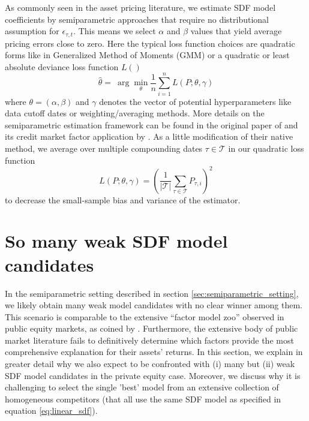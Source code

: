 \documentclass[12pt]{article}
\begin{document}
As commonly seen in the asset pricing literature, we estimate SDF model coefficients by semiparametric approaches that require no distributional assumption for $\epsilon_{\tau,t}$.
This means we select $\alpha$ and $\beta$ values that yield average pricing errors close to zero. 
Here the typical loss function choices are quadratic forms like in Generalized Method of Moments (GMM) or a quadratic or least absolute deviance loss function $L()$
\begin{equation}
\label{eq:minimization_estimation}
\hat{\theta } = \
\arg \min_{\theta} \frac{1}{n} \sum_{i=1}^n L \left( P ; \theta, \gamma \right)
\end{equation}
where $\theta=(\alpha,\beta)$ and $\gamma$ denotes the vector of potential hyperparameters like data cutoff dates or weighting/averaging methods.
More details on the semiparametric estimation framework can be found in the original paper of \cite{DLP12} and its credit market factor application by \cite{HSS23}.
As a little modification of their native method, we average over multiple compounding dates $\tau \in \mathcal{T}$ in our quadratic loss function
\begin{equation}
	\label{eq:quadratic_loss}
	L \left( P ; \theta, \gamma \right) = \left( \frac{1}{|\mathcal{T}|} \sum_{\tau \in \mathcal{T}} P_{\tau,i}  \right)^2
\end{equation}
to decrease the small-sample bias and variance of the estimator.


\section{So many weak SDF model candidates}
\label{sec:model_selection}

In the semiparametric setting described in section \ref{sec:semiparametric_setting}, we likely obtain many weak model candidates with no clear winner among them.
This scenario is comparable to the extensive ``factor model zoo'' observed in public equity markets, as coined by \cite{C11,FGX20}. Furthermore, the extensive body of public market literature fails to definitively determine which factors provide the most comprehensive explanation for their assets' returns.
In this section, we explain in greater detail why we also expect to be confronted with (i) many but (ii) weak SDF model candidates in the private equity case.
Moreover, we discuss why it is challenging to select the single 'best' model from an extensive collection of homogeneous competitors (that all use the same SDF model as specified in equation \ref{eq:linear_sdf}).
\end{document}
